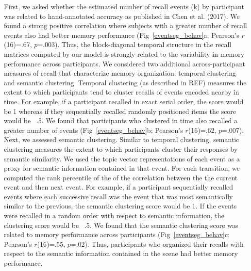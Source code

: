 \documentclass{article}
\begin{document}
{First, we asked whether the estimated number of recall events (k) by participant was related to hand-annotated accuracy as published in Chen et al. (2017).  We found a strong positive correlation where subjects with a greater number of recall events also had better memory performance (Fig~\ref{eventseg_behav}a; Pearson's $r$(16)=.67, $p$=.003). Thus, the block-diagonal temporal structure in the recall matrices computed by our model is strongly related to the variability in memory performance across participants.  We considered two additional across-participant measures of recall that characterize memory organization: temporal clustering and semantic clustering. Temporal clustering (as described in REF) measures the extent to which participants tend to cluster recalls of events encoded nearby in time.  For example, if a participant recalled in exact serial order, the score would be 1 whereas if they sequentially recalled randomly positioned items the score would be ~.5.  We found that participants who clustered in time also recalled a greater number of events (Fig~\ref{eventseg_behav}b; Pearson's $r$(16)=.62, $p$=.007). Next, we assessed semantic clustering.  Similar to temporal clustering, semantic clustering measures the extent to which participants cluster their responses by semantic similarity.  We used the topic vector representations of each event as a proxy for semantic information contained in that event.  For each transition, we computed the rank percentile of the of the correlation between the the current event and then next event. For example, if a participant sequentially recalled events where each successive recall was the event that was most semantically similar to the previous, the semantic clustering score would be 1.  If the events were recalled in a random order with respect to semantic information, the clustering score would be ~.5. We found that the semantic clustering score was related to memory performance across participants (Fig~\ref{eventseg_behav}c; Pearson's $r$(16)=.55, $p$=.02).  Thus, participants who organized their recalls with respect to the semantic information contained in the scene had better memory performance.

}
\end{document}
